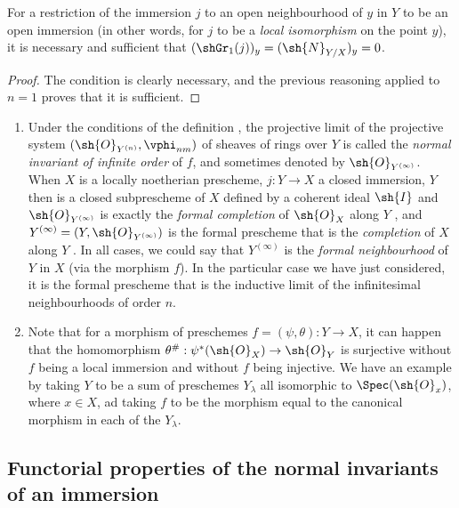 \begin{corollary}[16.1.10]
\label{IV.16.1.10}
For a restriction of the immersion $j$ to an open neighbourhood of $y$ in $Y$ to be an open immersion (in other words, for $j$ to be a \emph{local isomorphism} on the point $y$), it is necessary and sufficient that $(\shGr_1(j))_y = (\sh{N}_{Y/X})_y = 0$.
\end{corollary}

\begin{proof}
The condition is clearly necessary, and the previous reasoning applied to $n=1$ proves that it is sufficient.
\end{proof}

\begin{remark}[16.1.11]
\label{IV.16.1.11}
\medskip\noindent
\begin{enumerate}
  \item[(i)] Under the conditions of the definition , the projective limit of the projective system $(\sh{O}_{Y^{(n)}}, \vphi_{nm})$ of sheaves of rings over $Y$ is called the \emph{normal invariant of infinite order} of $f$, and sometimes denoted by $\sh{O}_{Y^{(\infty)}}$.
  When $X$ is a locally noetherian prescheme, $j:Y \to X$ a closed immersion, $Y$ then is a closed subprescheme of $X$ defined by a coherent ideal $\sh{I}$ and $\sh{O}_{Y^{(\infty)}}$ is exactly the \emph{formal completion} of $\sh{O}_X$ along $Y$ , and $Y^{(\infty)} = (Y, \sh{O}_{Y^{(\infty)}})$ is the formal prescheme that is the \emph{completion} of $X$ along $Y$ .
  In all cases, we could say that $Y^{(\infty)}$ is the \emph{formal neighbourhood} of $Y$ in $X$ (via the morphism $f$).
  In the particular case we have just considered, it is the formal prescheme that is the inductive limit of the infinitesimal neighbourhoods of order $n$.
  \item[(ii)] Note that for a morphism of preschemes $f=(\psi, \theta): Y \to X$, it can happen that the homomorphism $\theta^\#:\psi^*(\sh{O}_X) \to \sh{O}_Y$ is surjective without $f$ being a local 
  immersion and without $f$ being injective.
  We have an example by taking $Y$ to be a sum of preschemes $Y_\lambda$ all isomorphic to $\Spec(\sh{O}_x)$, where $x \in X$, ad taking $f$ to be the morphism equal to the canonical morphism in each of the $Y_\lambda$.
\end{enumerate}
\end{remark}

\subsection{Functorial properties of the normal invariants of an immersion}
\label{IV.16.2}


